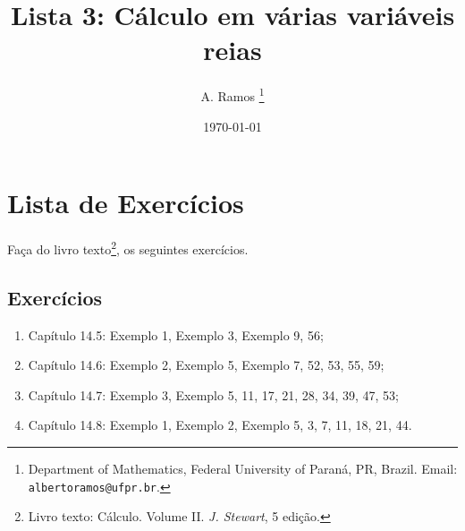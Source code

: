 \documentclass[11pt]{article}
\begin{document}
\title{Lista 3: Cálculo em várias variáveis reias }
 
\author{
A. Ramos \thanks{Department of Mathematics,
    Federal University of Paraná, PR, Brazil.
    Email: {\tt albertoramos@ufpr.br}.}
}

\date{\today}
 
\maketitle

  \section{Lista de Exercícios}   
 
 Faça do livro texto\footnote{Livro texto: Cálculo. Volume II. {\it J. Stewart}, 5 edição.}, os seguintes exercícios. 
  
    \subsection{Exercícios}
     
     \begin{enumerate}    
     \item Capítulo 14.5: Exemplo 1, Exemplo 3, Exemplo 9, 56; 
     \item Capítulo 14.6: Exemplo 2, Exemplo 5, Exemplo 7, 52, 53, 55, 59; 
     \item Capítulo 14.7: Exemplo 3, Exemplo 5, 11, 17, 21, 28, 34, 39, 47, 53;
     \item  Capítulo 14.8: Exemplo 1, Exemplo 2, Exemplo 5, 3, 7, 11, 18, 21, 44.             
     \end{enumerate}
 
\end{document}
